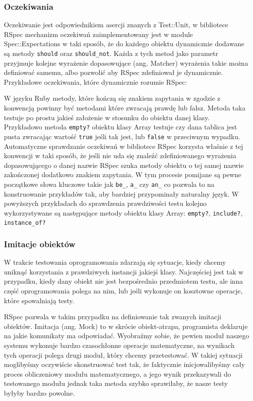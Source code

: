     \subsubsection{Oczekiwania}
    Oczekiwanie jest odpowiednikiem asercji znanych z Test::Unit, w bibliotece RSpec mechanizm oczekiwań zaimplementowany jest w module Spec::Expectations w taki sposób, że do każdego obiektu dynamicznie dodawane są metody \verb+should+ oraz \verb+should_not+. Każda z tych metod jako parametr przyjmuje kolejne wyrażenie dopasowujące (ang. Matcher) wyrażenia takie można definiować samemu, albo pozwolić aby RSpec zdefiniował je dynamicznie. Przykładowe oczekiwania, które dynamicznie rozumie RSpec:
    
    
    
    W języku Ruby metody, które kończą się znakiem zapytania w zgodzie z konwencją powinny być metodami które zwracają prawdę lub fałsz. Metoda taka testuje po prostu jakieś założenie w stosunku do obiektu danej klasy. Przykładowo metoda \verb+empty?+ obiektu klasy Array testuje czy dana tablica jest pusta zwracając wartość \verb+true+ jeśli tak jest, lub \verb+false+ w przeciwnym wypadku. Automatyczne sprawdzanie oczekiwań w bibliotece RSpec korzysta właśnie z tej konwencji w taki sposób, że jeśli nie uda się znaleźć zdefiniowanego wyrażenia dopasowującego o danej nazwie RSpec szuka metody obiektu o tej samej nazwie zakończonej dodatkowo znakiem zapytania. W tym procesie pomijane są pewne początkowe słowa kluczowe takie jak \verb+be_+, \verb+a_+ czy \verb+an_+ co pozwala to na konstruowanie przykładów tak, aby bardziej przypominały naturalny język. W powyższych przykładach do sprawdzenia prawdziwości testu kolejno wykorzystywane są następujące metody obiektu klasy Array: \verb+empty?+, \verb+include?+, \verb+instance_of?+
    
    \subsubsection{Imitacje obiektów}
    W trakcie testowania oprogramowania zdarzają się sytuacje, kiedy chcemy uniknąć korzystania z prawdziwych instancji jakiejś klasy. Najczęściej jest tak w przypadku, kiedy dany obiekt nie jest bezpośrednio przedmiotem testu, ale inna część oprogramowania polega na nim, lub jeśli wykonuje on kosztowne operacje, które spowalniają testy.
    
    RSpec pozwala w takim przypadku na definiowanie tak zwanych imitacji obiektów. Imitacja (ang. Mock) to w skrócie obiekt-atrapa, programista deklaruje na jakie komunikaty ma odpowiadać. Wyobraźmy sobie, że pewien moduł naszego systemu wykonuje bardzo czasochłonne operacje matematyczne, na wynikach tych operacji polega drugi moduł, który chcemy przetestować. W takiej sytuacji moglibyśmy oczywiście skonstruować test tak, że faktycznie inicjowalibyśmy cały proces obliczeniowy modułu matematycznego, a jego wynik przekazywali do testowanego modułu jednak taka metoda szybko sprawiłaby, że nasze testy byłyby bardzo powolne. 
    
